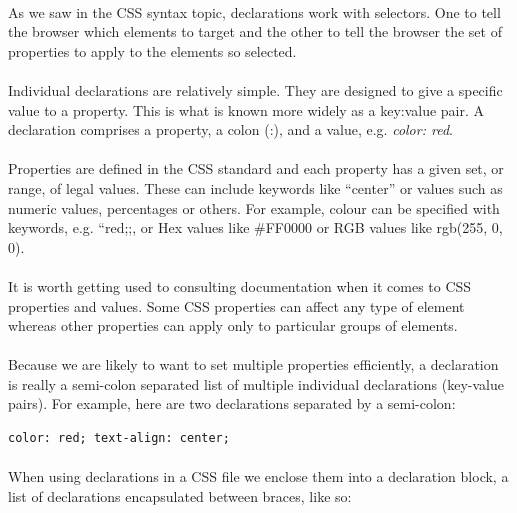\paragraph{} As we saw in the CSS syntax topic, declarations work with selectors. One to tell the browser which elements to target and the other to tell the browser the set of properties to apply to the elements so selected.
\paragraph{} Individual declarations are relatively simple. They are designed to give a specific value to a property. This is what is known more widely as a key:value pair. A declaration comprises a property, a colon (:), and a value, e.g. {\emph{color: red}}.
\paragraph{} Properties are defined in the CSS standard and each property has a given set, or range, of legal values. These can include keywords like ``center'' or values such as numeric values, percentages or others. For example, colour can be specified with keywords, e.g. ``red;;, or Hex values  like \#FF0000 or RGB values like rgb(255, 0, 0).
\paragraph{} It is worth getting used to consulting documentation when it comes to CSS properties and values. Some CSS properties can affect any type of element whereas other properties can apply only to particular groups of elements.
\paragraph{} Because we are likely to want to set multiple properties efficiently, a declaration is really a semi-colon separated list of multiple individual declarations (key-value pairs). For example, here are two declarations separated by a semi-colon:

\begin{lstlisting}
color: red; text-align: center;
\end{lstlisting}

\paragraph{} When using declarations in a CSS file we enclose them into a declaration block, a list of declarations encapsulated between braces, like so:


